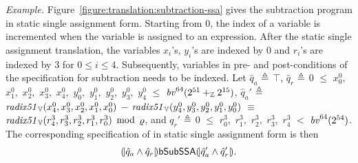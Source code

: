 \noindent
\emph{Example.}
Figure~\ref{figure:translation:subtraction-ssa} gives the subtraction program
 in static single assignment form. Starting from $0$, the
index of a variable is incremented when the variable is assigned to an
expression. After the static single assignment translation, the
variables ${x}_i$'s, ${y}_i$'s are indexed by $0$ and
${r}_i$'s are indexed by $3$ for $0 \leq i \leq 4$.
Subsequently, variables in pre- and post-conditions of the
specification for subtraction needs to be indexed.
Let $\hat{q}_a$ $\defn$ $\top$, $\hat{q}_r$ $\defn$ $0$ $\leq$ ${x}^0_0,$ ${x}^0_1,$ ${x}^0_2,$ ${x}^0_3,$ ${x}^0_4,$ ${y}^0_0,$ ${y}^0_1,$ ${y}^0_2,$ ${y}^0_3,$ ${y}^0_4$ $\leq$ $\bv^{64}(2^{51} +_\bbfZ 2^{15})$, $\hat{q}_a'$ $\defn$ $\mathit{radix51}_\BV({x}^0_4, {x}^0_3, {x}^0_2, {x}^0_1, {x}^0_0)$ $-$ $\mathit{radix51}_\BV({y}^0_4, {y}^0_3, {y}^0_2, {y}^0_1, {y}^0_0)$ $\equiv$ $\mathit{radix51}_\BV({r}^3_4, {r}^3_3, {r}^3_2, {r}^3_1, {r}^3_0)$ $\mod$ $\myprime$, and $q_r'$ $\defn$ $0$ $\leq$ ${r}^3_0,$ ${r}^3_1,$ ${r}^3_2,$ ${r}^3_3,$ ${r}^3_4$ $<$ $\bv^{64}(2^{54})$.
The corresponding specification of in static single assignment form is then
\[
\cond{\hat{q}_a \wedge \hat{q}_r} \dslcode{bSubSSA} \cond{\hat{q}_a' \wedge \hat{q}_r'}.
\]

